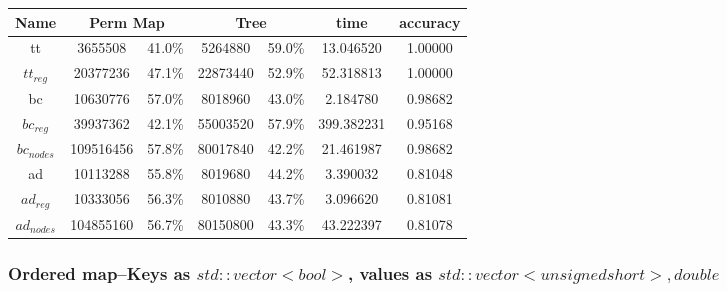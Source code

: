 \documentclass[]{article}
\begin{document}
\begin{center}
\begin{tabular} { |c|c|c|c|c|c|c| }
\hline
Name & \multicolumn{2}{c|}{Perm Map} & \multicolumn{2}{c|}{Tree} & time & accuracy \\
\hline

tt & 3655508 & 41.0\%  & 5264880 & 59.0\% & 13.046520 & 1.00000 \\

$tt_{reg}$ & 20377236 & 47.1\% & 22873440 & 52.9\% & 52.318813 & 1.00000 \\

bc & 10630776 & 57.0\% & 8018960 & 43.0\% & 2.184780 & 0.98682 \\

$bc_{reg}$ & 39937362 & 42.1\% & 55003520 & 57.9\% & 399.382231 & 0.95168 \\

$bc_{nodes}$ & 109516456 & 57.8\% & 80017840 & 42.2\% & 21.461987 & 0.98682 \\

ad & 10113288 & 55.8\% & 8019680 & 44.2\% & 3.390032 & 0.81048 \\

$ad_{reg}$ &10333056 & 56.3\% & 8010880 & 43.7\% & 3.096620 & 0.81081 \\

$ad_{nodes}$ & 104855160 & 56.7\% & 80150800 & 43.3\% & 43.222397 & 0.81078 \\
\hline
\end{tabular}
\end{center}

\subsubsection{Ordered map--Keys as $std::vector<bool>$, values as $std::vector<unsigned short>, double$}
\end{document}

